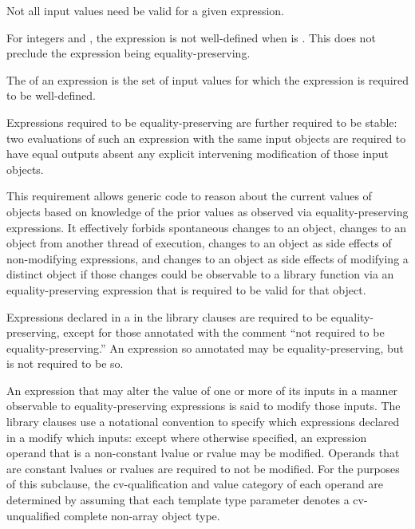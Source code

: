 \pnum
Not all input values need be valid for a given expression.
\begin{example}
For integers  and ,
the expression  is not well-defined
when  is .
This does not preclude the expression  being equality-preserving.
\end{example}
The  of an expression is the set of
input values for which the expression is required to be well-defined.

\pnum
Expressions required to be equality-preserving are further
required to be stable: two evaluations of such an expression with the same input
objects are required to have equal outputs absent any explicit intervening
modification of those input objects.
\begin{note}
This requirement allows generic code to reason about the current values of
objects based on knowledge of the prior values as observed via
equality-preserving expressions. It effectively forbids spontaneous changes to
an object, changes to an object from another thread of execution, changes to an
object as side effects of non-modifying expressions, and changes to an object as
side effects of modifying a distinct object if those changes could be observable
to a library function via an equality-preserving expression that is required to
be valid for that object.
\end{note}

\pnum
Expressions declared in a  in the library clauses are
required to be equality-preserving, except for those annotated with the comment
``not required to be equality-preserving.'' An expression so annotated
may be equality-preserving, but is not required to be so.

\pnum
An expression that may alter the value of one or more of its inputs in a manner
observable to equality-preserving expressions is said to modify those inputs.
The library clauses use a notational convention to specify which expressions declared
in a  modify which inputs: except where
otherwise specified, an expression operand that is a non-constant lvalue or
rvalue may be modified. Operands that are constant lvalues or rvalues are
required to not be modified.
For the purposes of this subclause,
the cv-qualification and value category of each operand
are determined by assuming
that each template type parameter
denotes a cv-unqualified complete non-array object type.

